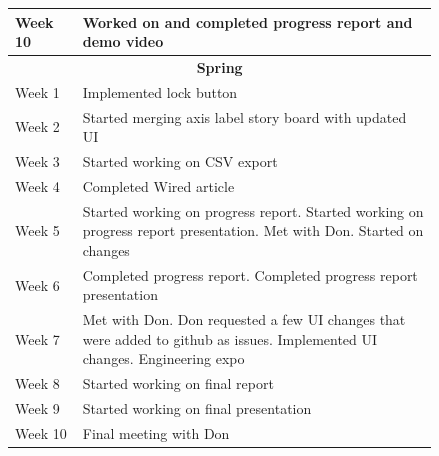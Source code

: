 \documentclass[onecolumn, draftclsnofoot,10pt, compsoc]{IEEEtran}
\begin{document}
\begin{center}
\begin{longtable}{| l | p{0.84\linewidth}|}
    Week 10 & Worked on and completed progress report and demo video \\ \hline
    \multicolumn{2}{c}{\textbf{Spring}} \\ \hline
    Week 1 & Implemented lock button \\ \hline
	Week 2 & Started merging axis label story board with updated UI \\ \hline
	Week 3 & Started working on CSV export \\ \hline
	Week 4 & Completed Wired article \\ \hline
    Week 5 & Started working on progress report. Started working on progress report presentation. Met with Don. Started on changes \\ \hline
    Week 6 & Completed progress report. Completed progress report presentation \\ \hline
	Week 7 & Met with Don. Don requested a few UI changes that were added to github as issues. Implemented UI changes. Engineering expo \\ \hline
	Week 8 & Started working on final report \\ \hline
	Week 9 & Started working on final presentation \\ \hline
    Week 10 & Final meeting with Don
\\ \hline
\end{longtable}
\end{center}
\end{document}

